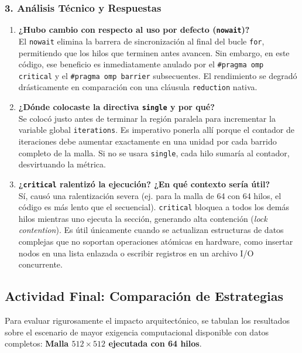 \documentclass[11pt,a4paper]{article}
\begin{document}
\subsubsection*{3. Análisis Técnico y Respuestas}

\begin{enumerate}
    \item \textbf{¿Hubo cambio con respecto al uso por defecto (\texttt{nowait})?} \\
    El \texttt{nowait} elimina la barrera de sincronización al final del bucle \texttt{for}, permitiendo que los hilos que terminen antes avancen. Sin embargo, en este código, ese beneficio es inmediatamente anulado por el \texttt{\#pragma omp critical} y el \texttt{\#pragma omp barrier} subsecuentes. El rendimiento se degradó drásticamente en comparación con una cláusula \texttt{reduction} nativa.

    \item \textbf{¿Dónde colocaste la directiva \texttt{single} y por qué?} \\
    Se colocó justo antes de terminar la región paralela para incrementar la variable global \texttt{iterations}. Es imperativo ponerla allí porque el contador de iteraciones debe aumentar exactamente en una unidad por cada barrido completo de la malla. Si no se usara \texttt{single}, cada hilo sumaría al contador, desvirtuando la métrica.

    \item \textbf{¿\texttt{critical} ralentizó la ejecución? ¿En qué contexto sería útil?} \\
    Sí, causó una ralentización severa (ej. para la malla de 64 con 64 hilos, el código es más lento que el secuencial). \texttt{critical} bloquea a todos los demás hilos mientras uno ejecuta la sección, generando alta contención (\textit{lock contention}). Es útil únicamente cuando se actualizan estructuras de datos complejas que no soportan operaciones atómicas en hardware, como insertar nodos en una lista enlazada o escribir registros en un archivo I/O concurrente.
\end{enumerate}

\subsection*{Actividad Final: Comparación de Estrategias}

Para evaluar rigurosamente el impacto arquitectónico, se tabulan los resultados sobre el escenario de mayor exigencia computacional disponible con datos completos: \textbf{Malla $512 \times 512$ ejecutada con 64 hilos}.
\end{document}
